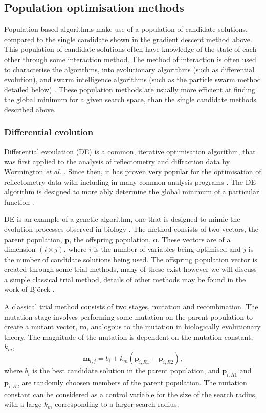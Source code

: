 \subsection{Population optimisation methods}
Population-based algorithms make use of a population of candidate solutions, compared to the single candidate shown in the gradient descent method above.
This population of candidate solutions often have knowledge of the state of each other through some interaction method.
The method of interaction is often used to characterise the algorithms, into evolutionary algorithms (such as differential evolution), and swarm intelligence algorithms (such as the particle swarm method detailed below) \cite{wu_ensemble_2019}.
These population methods are usually more efficient at finding the global minimum for a given search space, than the single candidate methods described above.

\subsubsection{Differential evolution}
\label{sec:de}
Differential evoulation (DE) is a common, iterative optimisation algorithm, that was first applied to the analysis of reflectometry and diffraction data by Wormington \emph{et al.} \cite{wormington_characterization_1999}.
Since then, it has proven very popular for the optimisation of reflectometry data with including in many common analysis programs \cite{bjorck_fitting_2011,bjorck_genx_2007,nelson_co-refinement_2006,nelson_refnx_2019,ott_simulreflec_2008,kienzle_ncnr_2006}.
The DE algorithm is designed to more ably determine the global minimum of a particular function \cite{storn_differential_1997}.

DE is an example of a genetic algorithm, one that is designed to mimic the evolution processes observed in biology \cite{holland_adaptation_1992}.
The method consists of two vectors, the parent population, $\mathbf{p}$, the offspring population, $\mathbf{o}$.
These vectors are of a dimension $(i\times j)$, where $i$ is the number of variables being optimised and $j$ is the number of candidate solutions being used.
The offspring population vector is created through some trial methods, many of these exist however we will discuss a simple classical trial method, details of other methods may be found in the work of Bj\"{o}rck \cite{bjorck_fitting_2011}.

A classical trial method consists of two stages, mutation and recombination.
The mutation stage involves performing some mutation on the parent population to create a mutant vector, $\mathbf{m}$, analogous to the mutation in biologically evolutionary theory.
The magnitude of the mutation is dependent on the mutation constant, $k_m$,
%
\begin{equation}
\mathbf{m}_{i,j}= b_{i} + k_m(\mathbf{p}_{i,R1} - \mathbf{p}_{i,R2}),
\end{equation}
%
where $b_{i}$ is the best candidate solution in the parent population, and $\mathbf{p}_{i,R1}$ and $\mathbf{p}_{i,R2}$ are randomly choosen members of the parent population.
The mutation constant can be considered as a control variable for the size of the search radius, with a large $k_m$ corresponding to a larger search radius.

